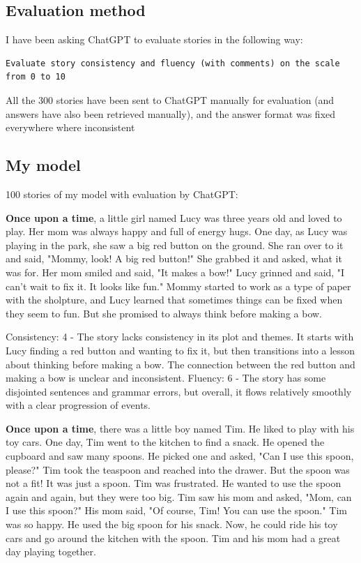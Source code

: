 \documentclass{article}
\begin{document}
\subsection{Evaluation method}

I have been asking ChatGPT to evaluate stories in the following way:
\begin{verbatim}
Evaluate story consistency and fluency (with comments) on the scale from 0 to 10
\end{verbatim}

All the 300 stories have been sent to ChatGPT manually for evaluation (and answers have also been retrieved manually), and the answer format was fixed everywhere where inconsistent


\subsection{My model}

100 stories of my model with evaluation by ChatGPT:

\textbf{Once upon a time}, a little girl named Lucy was three years old and loved to play. Her mom was always happy and full of energy hugs. One day, as Lucy was playing in the park, she saw a big red button on the ground. She ran over to it and said, "Mommy, look! A big red button!" She grabbed it and asked, what it was for. Her mom smiled and said, "It makes a bow!" Lucy grinned and said, "I can't wait to fix it. It looks like fun." Mommy started to work as a type of paper with the sholpture, and Lucy learned that sometimes things can be fixed when they seem to fun. But she promised to always think before making a bow.

Consistency: 4 - The story lacks consistency in its plot and themes. It starts with Lucy finding a red button and wanting to fix it, but then transitions into a lesson about thinking before making a bow. The connection between the red button and making a bow is unclear and inconsistent.
Fluency: 6 - The story has some disjointed sentences and grammar errors, but overall, it flows relatively smoothly with a clear progression of events.

\textbf{Once upon a time}, there was a little boy named Tim. He liked to play with his toy cars. One day, Tim went to the kitchen to find a snack. He opened the cupboard and saw many spoons. He picked one and asked, "Can I use this spoon, please?" Tim took the teaspoon and reached into the drawer. But the spoon was not a fit! It was just a spoon. Tim was frustrated. He wanted to use the spoon again and again, but they were too big. Tim saw his mom and asked, "Mom, can I use this spoon?" His mom said, "Of course, Tim! You can use the spoon." Tim was so happy. He used the big spoon for his snack. Now, he could ride his toy cars and go around the kitchen with the spoon. Tim and his mom had a great day playing together.
\end{document}
